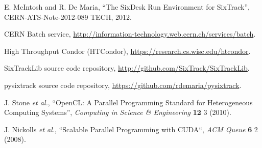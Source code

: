 \documentclass[a4paper,
              ]{jacow}
\begin{document}
\begin{thebibliography}{99}
E. McIntosh and R. De Maria, ``The SixDesk Run Environment for SixTrack'', CERN-ATS-Note-2012-089 TECH, 2012.

CERN Batch service, \url{http://information-technology.web.cern.ch/services/batch}.

High Throughput Condor (HTCondor), \url{https://research.cs.wisc.edu/htcondor}.














SixTrackLib source code repository,
\url{http://github.com/SixTrack/SixTrackLib}.

pysixtrack source code repository,
\url{https://github.com/rdemaria/pysixtrack}.

J. Stone {\it et al.}, ``OpenCL: A Parallel Programming Standard for Heterogeneous Computing Systems'', {\it  Computing in Science \& Engineering} {\bf 12} 3 (2010).

J. Nickolls {\it et al.}, ``Scalable Parallel Programming with CUDA``, {\it ACM Queue} {\bf 6} 2 (2008).

\end{thebibliography}
\null 
\end{document}
